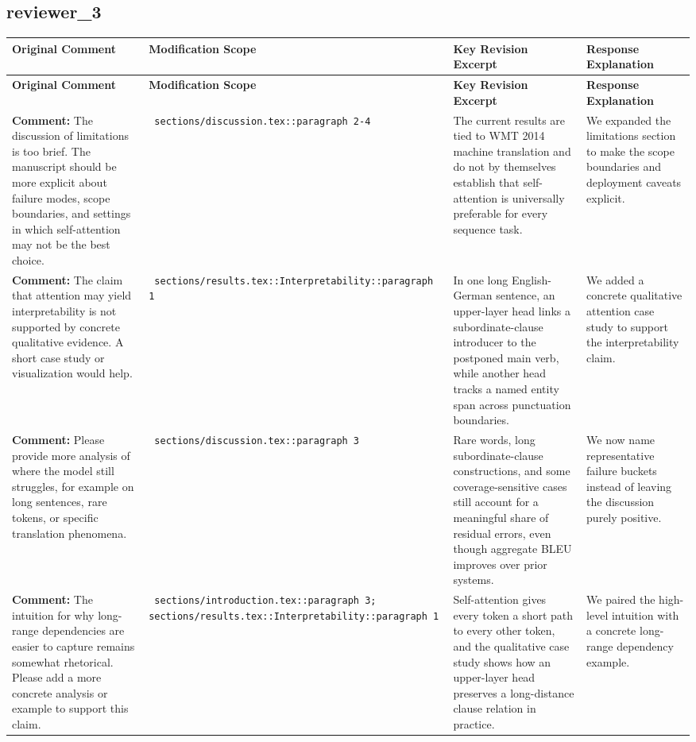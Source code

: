 \documentclass[11pt]{article}
\begin{document}
\subsection*{ reviewer\_3 }
\begin{longtable}{|p{}|p{}|p{}|p{}|}
\hline
\textbf{ Original Comment } & \textbf{ Modification Scope } & \textbf{ Key Revision Excerpt } & \textbf{ Response Explanation } \\
\hline
\endfirsthead
\hline
\textbf{ Original Comment } & \textbf{ Modification Scope } & \textbf{ Key Revision Excerpt } & \textbf{ Response Explanation } \\
\hline
\endhead
\textbf{ Comment: } The discussion of limitations is too brief. The manuscript should be more explicit about failure modes, scope boundaries, and settings in which self-attention may not be the best choice. & \texttt{ sections/discussion.tex::paragraph 2-4 } & {\color{blue}\ttfamily The current results are tied to WMT 2014 machine translation and do not by themselves establish that self-attention is universally preferable for every sequence task.} & We expanded the limitations section to make the scope boundaries and deployment caveats explicit. \\
\hline
\textbf{ Comment: } The claim that attention may yield interpretability is not supported by concrete qualitative evidence. A short case study or visualization would help. & \texttt{ sections/results.tex::Interpretability::paragraph 1 } & {\color{blue}\ttfamily In one long English-German sentence, an upper-layer head links a subordinate-clause introducer to the postponed main verb, while another head tracks a named entity span across punctuation boundaries.} & We added a concrete qualitative attention case study to support the interpretability claim. \\
\hline
\textbf{ Comment: } Please provide more analysis of where the model still struggles, for example on long sentences, rare tokens, or specific translation phenomena. & \texttt{ sections/discussion.tex::paragraph 3 } & {\color{blue}\ttfamily Rare words, long subordinate-clause constructions, and some coverage-sensitive cases still account for a meaningful share of residual errors, even though aggregate BLEU improves over prior systems.} & We now name representative failure buckets instead of leaving the discussion purely positive. \\
\hline
\textbf{ Comment: } The intuition for why long-range dependencies are easier to capture remains somewhat rhetorical. Please add a more concrete analysis or example to support this claim. & \texttt{ sections/introduction.tex::paragraph 3; sections/results.tex::Interpretability::paragraph 1 } & {\color{blue}\ttfamily Self-attention gives every token a short path to every other token, and the qualitative case study shows how an upper-layer head preserves a long-distance clause relation in practice.} & We paired the high-level intuition with a concrete long-range dependency example. \\

\end{longtable}
\end{document}
